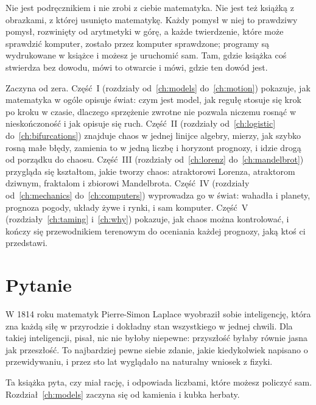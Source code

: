 Nie jest podręcznikiem i nie zrobi z ciebie matematyka. Nie jest też książką
z obrazkami, z której usunięto matematykę. Każdy pomysł w niej to prawdziwy
pomysł, rozwinięty od arytmetyki w górę, a każde twierdzenie, które może
sprawdzić komputer, zostało przez komputer sprawdzone; programy są
wydrukowane w książce i możesz je uruchomić sam. Tam, gdzie książka coś
stwierdza bez dowodu, mówi to otwarcie i mówi, gdzie ten dowód jest.

Zaczyna od zera. Część~I (rozdziały od~\ref{ch:models}
do~\ref{ch:motion}) pokazuje, jak matematyka w ogóle opisuje świat: czym
jest model, jak regułę stosuje się krok po kroku w czasie, dlaczego sprzężenie
zwrotne nie pozwala niczemu rosnąć w nieskończoność i jak opisuje się ruch.
Część~II (rozdziały od~\ref{ch:logistic} do~\ref{ch:bifurcations}) znajduje
chaos w jednej linijce algebry, mierzy, jak szybko rosną małe błędy, zamienia
to w jedną liczbę i horyzont prognozy, i idzie drogą od porządku do chaosu.
Część~III (rozdziały od~\ref{ch:lorenz} do~\ref{ch:mandelbrot}) przygląda się
kształtom, jakie tworzy chaos: atraktorowi Lorenza, atraktorom dziwnym,
fraktalom i zbiorowi Mandelbrota. Część~IV (rozdziały od~\ref{ch:mechanics}
do~\ref{ch:computers}) wyprowadza go w świat: wahadła i planety, prognoza
pogody, układy żywe i rynki, i sam komputer. Część~V
(rozdziały~\ref{ch:taming} i~\ref{ch:why}) pokazuje, jak chaos można
kontrolować, i kończy się przewodnikiem terenowym do oceniania każdej
prognozy, jaką ktoś ci przedstawi.

\section*{Pytanie}

W 1814 roku matematyk Pierre-Simon Laplace wyobraził sobie inteligencję,
która zna każdą siłę w przyrodzie i dokładny stan wszystkiego w jednej
chwili. Dla takiej inteligencji, pisał, nic nie byłoby niepewne: przyszłość
byłaby równie jasna jak przeszłość. To najbardziej pewne siebie zdanie, jakie
kiedykolwiek napisano o przewidywaniu, i przez sto lat wyglądało na naturalny
wniosek z fizyki.

Ta książka pyta, czy miał rację, i odpowiada liczbami, które możesz policzyć
sam. Rozdział~\ref{ch:models} zaczyna się od kamienia i kubka herbaty.
